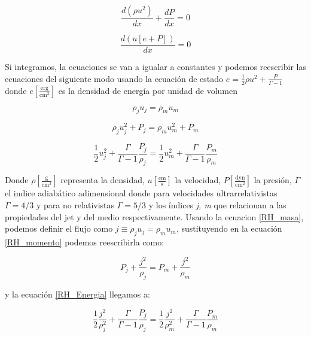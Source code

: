 \documentclass[12pt,a4paper]{book}
\begin{document}
\begin{equation}
\dfrac{d \left( \rho u^2 \right)}{d x}+ \dfrac{d P}{d x}=0
\end{equation}

\begin{equation}
\dfrac{d \left( u\left[e +P \right] \right)}{d x} = 0
\end{equation}

Si integramos, la ecuaciones se van a igualar a constantes y podemos reescribir las ecuaciones del siguiente modo usando 
la ecuación de estado $e = \frac{1}{2} \rho u^2 + \frac{P}{\Gamma-1}$ donde $e \left[\frac{\mathrm{erg}}{\mathrm{cm^3}}\right]$ 
es la densidad de energía por unidad de volumen

\begin{equation}\label{RH_masa}
\rho_j u_j = \rho_m u_m
\end{equation}

\begin{equation}\label{RH_momento}
\rho_j u_{j}^{2}+P_j = \rho_m u_{m}^{2}+P_m
\end{equation}

\begin{equation}\label{RH_Energia}
\frac{1}{2} u_{j}^{2}+ \frac{\Gamma}{\Gamma-1} \frac{P_{j}}{\rho_{j}} =
 \frac{1}{2} u_{m}^{2}+ \frac{\Gamma}{\Gamma-1} \frac{P_{m}}{\rho_{m}}
\end{equation}

Donde $\rho \left[\frac{\mathrm{g}}{\mathrm{cm}^3}\right]$ representa la densidad, $u \left[\frac{\mathrm{cm}}{\mathrm{s} }\right]$ la velocidad, 
$P \left[\frac{\mathrm{dyn}}{\mathrm{cm}^2} \right]$ la presión, $\Gamma$ el indice adiabático adimensional donde para velocidades ultrarrelativistas 
$\Gamma = 4/3$ y para no relativistas $\Gamma = 5/3$ y los índices \textit{j, m} que  relacionan a las propiedades del jet y del medio respectivamente. Usando la ecuacion \ref{RH_masa}, podemos definir el flujo como $j \equiv \rho_j u_j = \rho_m u_m$, sustituyendo en la ecuación \ref{RH_momento} podemos reescribirla como:

\begin{equation}\label{RH_momento_j}
P_{j}+\frac{j^2}{\rho_{j}}=P_{m}+\frac{j^2}{\rho_{m}}
\end{equation}

y la ecuación \ref{RH_Energia} llegamos a:

\begin{equation}\label{RH_Energia_j}
\frac{1}{2} \frac{j^{2}}{\rho_{j}^2}+\frac{\Gamma}{\Gamma-1} \frac{P_{j}}{\rho_{j}}=
\frac{1}{2} \frac{j^{2}}{\rho_{m}^2}+\frac{\Gamma}{\Gamma-1} \frac{P_{m}}{\rho_{m}}
\end{equation}
\end{document}
